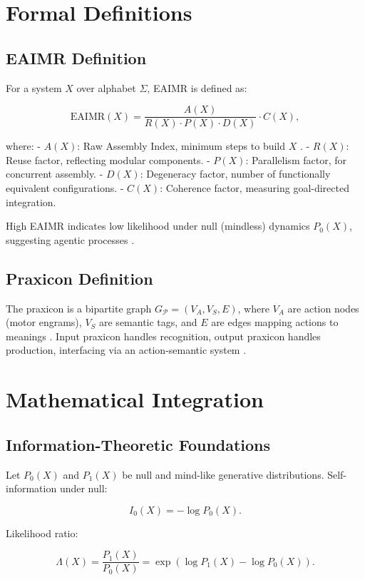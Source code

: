 \documentclass{article}
\begin{document}
\section{Formal Definitions}
\label{sec:formal}

\subsection{EAIMR Definition}
For a system \(X\) over alphabet \(\Sigma\), EAIMR is defined as:

\[
\text{EAIMR}(X) = \frac{A(X)}{R(X) \cdot P(X) \cdot D(X)} \cdot C(X),
\]

where:
- \(A(X)\): Raw Assembly Index, minimum steps to build \(X\) \citep{walker2013}.
- \(R(X)\): Reuse factor, reflecting modular components.
- \(P(X)\): Parallelism factor, for concurrent assembly.
- \(D(X)\): Degeneracy factor, number of functionally equivalent configurations.
- \(C(X)\): Coherence factor, measuring goal-directed integration.

High EAIMR indicates low likelihood under null (mindless) dynamics \(P_0(X)\), suggesting agentic processes \citep{adami2012}.

\subsection{Praxicon Definition}
The praxicon is a bipartite graph \(G_{\mathcal{P}} = (V_A, V_S, E)\), where \(V_A\) are action nodes (motor engrams), \(V_S\) are semantic tags, and \(E\) are edges mapping actions to meanings \citep{pastra2011}. Input praxicon handles recognition, output praxicon handles production, interfacing via an action-semantic system \citep{peigneux2004}.

\section{Mathematical Integration}
\label{sec:integration}

\subsection{Information-Theoretic Foundations}
Let \(P_0(X)\) and \(P_1(X)\) be null and mind-like generative distributions. Self-information under null:

\[
I_0(X) = -\log P_0(X).
\]

Likelihood ratio:

\[
\Lambda(X) = \frac{P_1(X)}{P_0(X)} = \exp(\log P_1(X) - \log P_0(X)).
\]
\end{document}
